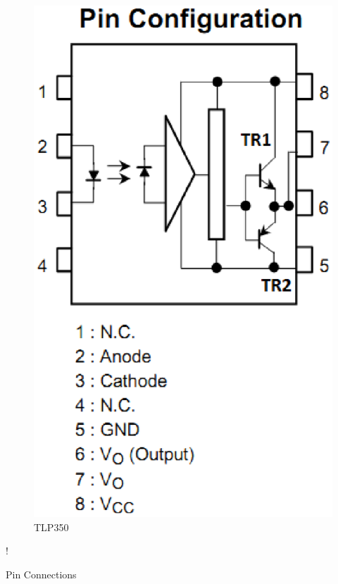 \documentclass[journal,12pt,twocolumn]{IEEEtran}
\begin{document}
\begin{figure}[!ht]
\centering
\includegraphics[width=\columnwidth]{./figs/pinout.eps}
\caption{ TLP350}  
\label{fig5}
\end{figure}

\begin{table}[!ht]
\centering
\resizebox {\columnwidth} {!} {

}
\caption{Pin Connections} 
\label{table:connections}
\end{table}  
\end{document}
